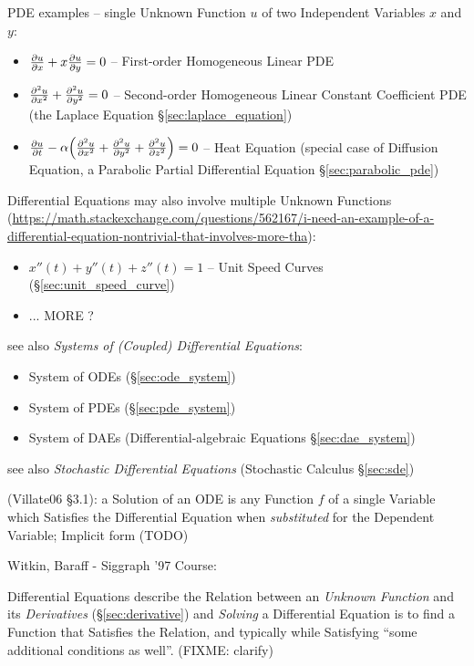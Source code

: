 PDE examples -- single Unknown Function $u$ of two Independent Variables $x$ and
$y$:
\begin{itemize}
\item $\frac{\partial{u}}{\partial{x}} + x\frac{\partial{u}}{\partial{y}} = 0$ -- First-order Homogeneous Linear PDE
\item $\frac{\partial{^2u}}{\partial{x^2}} + \frac{\partial{^2u}}{\partial{y^2}} = 0$ -- Second-order Homogeneous
  Linear Constant Coefficient PDE (the Laplace Equation
  \S\ref{sec:laplace_equation})
\item $\frac{\partial{u}}{\partial{t}} - \alpha\Big(
      \frac{\partial{^2u}}{\partial{x^2}} + \frac{\partial{^2u}}{\partial{y^2}} + \frac{\partial{^2u}}{\partial{z^2}}
    \Big) = 0$ -- Heat Equation (special case of Diffusion Equation, a Parabolic
    Partial Differential Equation \S\ref{sec:parabolic_pde})
\end{itemize}

Differential Equations may also involve multiple Unknown Functions
(\url{https://math.stackexchange.com/questions/562167/i-need-an-example-of-a-differential-equation-nontrivial-that-involves-more-tha}):
\begin{itemize}
  \item $x''(t) + y''(t) + z''(t) = 1$ -- Unit Speed Curves
    (\S\ref{sec:unit_speed_curve})
  \item ... MORE ?
\end{itemize}

see also \emph{Systems of (Coupled) Differential Equations}:
\begin{itemize}
  \item System of ODEs (\S\ref{sec:ode_system})
  \item System of PDEs (\S\ref{sec:pde_system})
  \item System of DAEs (Differential-algebraic Equations \S\ref{sec:dae_system})
\end{itemize}

\fist see also \emph{Stochastic Differential Equations} (Stochastic Calculus
\S\ref{sec:sde})

(Villate06 \S 3.1): a Solution of an ODE is any Function $f$ of a single
Variable which Satisfies the Differential Equation when \emph{substituted} for
the Dependent Variable; Implicit form (TODO)

Witkin, Baraff - Siggraph '97 Course:

Differential Equations describe the Relation between an \emph{Unknown Function}
and its \emph{Derivatives} (\S\ref{sec:derivative}) and \emph{Solving} a
Differential Equation is to find a Function that Satisfies the Relation, and
typically while Satisfying ``some additional conditions as well''. (FIXME:
clarify)

